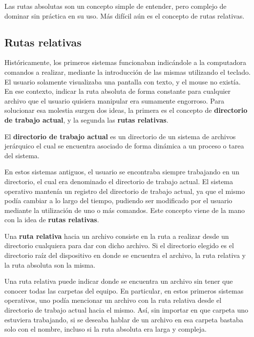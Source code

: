 Las rutas absolutas son un concepto simple de entender, pero complejo de dominar
sin práctica en su uso. Más difícil aún es el concepto de rutas relativas.

\subsection{Rutas relativas}

Históricamente, los primeros sistemas funcionaban indicándole a la computadora
comandos a realizar, mediante la introducción de las mismas utilizando el teclado.
El usuario solamente visualizaba una pantalla con texto, y el mouse no existía.
En ese contexto, indicar la ruta absoluta de forma constante para cualquier archivo
que el usuario quisiera manipular era sumamente engorroso. Para solucionar esa
molestia surgen dos ideas, la primera es el concepto de \textbf{directorio de
trabajo actual}, y la segunda las \textbf{rutas relativas}.

\begin{definition}
    El \textbf{directorio de trabajo actual} es un directorio de un sistema de
    archivos jerárquico el cual se encuentra asociado de forma dinámica a un
    proceso o tarea del sistema.
\end{definition}

En estos sistemas antiguos, el usuario se encontraba siempre trabajando en un
directorio, el cual era denominado el directorio de trabajo actual. El sistema
operativo mantenía un registro del directorio de trabajo actual, ya que el mismo
podía cambiar a lo largo del tiempo, pudiendo ser modificado por el usuario
mediante la utilización de uno o más comandos. Este concepto viene de la mano
con la idea de \textbf{rutas relativas}.

\begin{definition}
    Una \textbf{ruta relativa} hacia un archivo consiste en la ruta a realizar
    desde un directorio cualquiera para dar con dicho archivo. Si el directorio
    elegido es el directorio raíz del dispositivo en donde se encuentra el archivo,
    la ruta relativa y la ruta absoluta son la misma.\autocite[vid.]{foldoc_relative_2018}
\end{definition}

Una ruta relativa puede indicar donde se encuentra un archivo sin tener que
conocer todas las carpetas del equipo. En particular, en estos primeros sistemas
operativos, uno podía mencionar un archivo con la ruta relativa desde el
directorio de trabajo actual hacia el mismo. Así, sin importar en que carpeta uno
estuviera trabajando, si se deseaba hablar de un archivo en esa carpeta bastaba
solo con el nombre, incluso si la ruta absoluta era larga y compleja.

